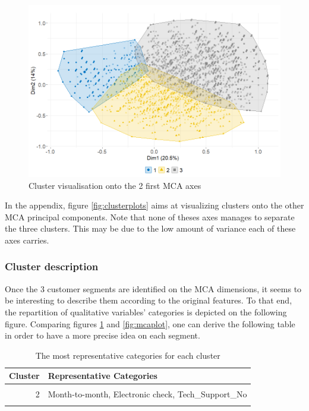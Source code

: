 \documentclass[
]{book}
\begin{document}
\begin{figure}

{\centering \includegraphics[width=12.83in]{./imgs/cluster_plot} 

}

\caption{Cluster visualisation onto the 2 first MCA axes}\label{fig:clusterplot}
\end{figure}

In the appendix, figure \ref{fig:clusterplots} aims at visualizing clusters onto the other MCA principal components. Note that none of theses axes manages to separate the three clusters. This may be due to the low amount of variance each of these axes carries.

\hypertarget{cluster-description}{%
\subsubsection*{Cluster description}\label{cluster-description}}

Once the 3 customer segments are identified on the MCA dimensions, it seems to be interesting to describe them according to the original features. To that end, the repartition of qualitative variables' categories is depicted on the following figure. Comparing figures \ref{fig:clusterplot} and \ref{fig:mcaplot}, one can derive the following table in order to have a more precise idea on each segment.

\begin{table}[H]

\caption{\label{tab:unnamed-chunk-24}The most representative categories for each cluster}
\centering
\begin{tabular}[t]{rl}
\toprule
Cluster & Representative Categories\\
\midrule
\cellcolor{gray!6}{1} & \cellcolor{gray!6}{Mailed\_check, Internet\_Service\_No}\\
2 & Month-to-month, Electronic check, Tech\_Support\_No\\
\cellcolor{gray!6}{3} & \cellcolor{gray!6}{Two year, Credit card, Tech\_Support\_Yes}\\
\bottomrule
\end{tabular}
\end{table}
\end{document}
